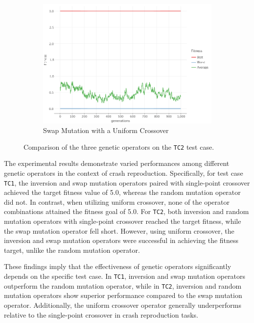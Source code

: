 \begin{figure}[ht!]
\begin{subfigure}{0.35\textwidth}
            \includegraphics[width=\textwidth]{img/beacon_uniform_swap_2.png}
            \caption{Swap Mutation with a Uniform Crossover}
            \label{fig:beacon:4:swap}
        \end{subfigure}
        \caption{Comparison of the three genetic operators on the \texttt{TC2} test case.}
        \label{fig:beacon:4}
    \end{figure}

    The experimental results demonstrate varied performances among different genetic operators in the context of crash 
    reproduction. Specifically, for test case \texttt{TC1}, the inversion and swap mutation operators paired with 
    single-point crossover achieved the target fitness value of 5.0, whereas the random mutation operator did not. In 
    contrast, when utilizing uniform crossover, none of the operator combinations attained the fitness goal of 5.0. For 
    \texttt{TC2}, both inversion and random mutation operators with single-point crossover reached the target fitness, 
    while the swap mutation operator fell short. However, using uniform crossover, the inversion and swap mutation 
    operators were successful in achieving the fitness target, unlike the random mutation operator.

    These findings imply that the effectiveness of genetic operators significantly depends on the specific test case. In 
    \texttt{TC1}, inversion and swap mutation operators outperform the random mutation operator, while in \texttt{TC2}, 
    inversion and random mutation operators show superior performance compared to the swap mutation operator. 
    Additionally, the uniform crossover operator generally underperforms relative to the single-point crossover in crash 
    reproduction tasks.

